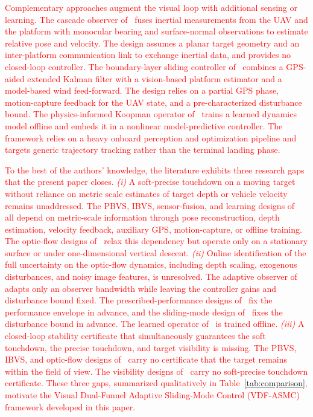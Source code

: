 \documentclass{IEEEtaes}
\newcommand{\new}[1]{\textcolor{red}{#1}}
\begin{document}
\new{Complementary approaches augment the visual loop with additional sensing or learning. The cascade observer of~\cite{bouazza2025} fuses inertial measurements from the UAV and the platform with monocular bearing and surface-normal observations to estimate relative pose and velocity. The design assumes a planar target geometry and an inter-platform communication link to exchange inertial data, and provides no closed-loop controller. The boundary-layer sliding controller of~\cite{paris2020} combines a GPS-aided extended Kalman filter with a vision-based platform estimator and a model-based wind feed-forward. The design relies on a partial GPS phase, motion-capture feedback for the UAV state, and a pre-characterized disturbance bound. The physics-informed Koopman operator of~\cite{kamath2026} trains a learned dynamics model offline and embeds it in a nonlinear model-predictive controller. The framework relies on a heavy onboard perception and optimization pipeline and targets generic trajectory tracking rather than the terminal landing phase.}

\new{To the best of the authors' knowledge, the literature exhibits three research gaps that the present paper closes. \emph{(i)} A soft-precise touchdown on a moving target without reliance on metric scale estimates of target depth or vehicle velocity remains unaddressed. The PBVS, IBVS, sensor-fusion, and learning designs of~\cite{lin2022, zhang2026, cho2022, lin2023, bouazza2025, paris2020, kamath2026} all depend on metric-scale information through pose reconstruction, depth estimation, velocity feedback, auxiliary GPS, motion-capture, or offline training. The optic-flow designs of~\cite{herisse2012, izzo2011, singhal2025} relax this dependency but operate only on a stationary surface or under one-dimensional vertical descent. \emph{(ii)} Online identification of the full uncertainty on the optic-flow dynamics, including depth scaling, exogenous disturbances, and noisy image features, is unresolved. The adaptive observer of~\cite{zhang2026} adapts only an observer bandwidth while leaving the controller gains and disturbance bound fixed. The prescribed-performance designs of~\cite{lin2022, lin2023} fix the performance envelope in advance, and the sliding-mode design of~\cite{paris2020} fixes the disturbance bound in advance. The learned operator of~\cite{kamath2026} is trained offline. \emph{(iii)} A closed-loop stability certificate that simultaneously guarantees the soft touchdown, the precise touchdown, and target visibility is missing. The PBVS, IBVS, and optic-flow designs of~\cite{lin2022, zhang2026, cho2022, lin2023, herisse2012, izzo2011, singhal2025} carry no certificate that the target remains within the field of view. The visibility designs of~\cite{salehi2021, xie2016} carry no soft-precise touchdown certificate. These three gaps, summarized qualitatively in Table~\ref{tab:comparison}, motivate the Visual Dual-Funnel Adaptive Sliding-Mode Control (VDF-ASMC) framework developed in this paper.}
\end{document}

